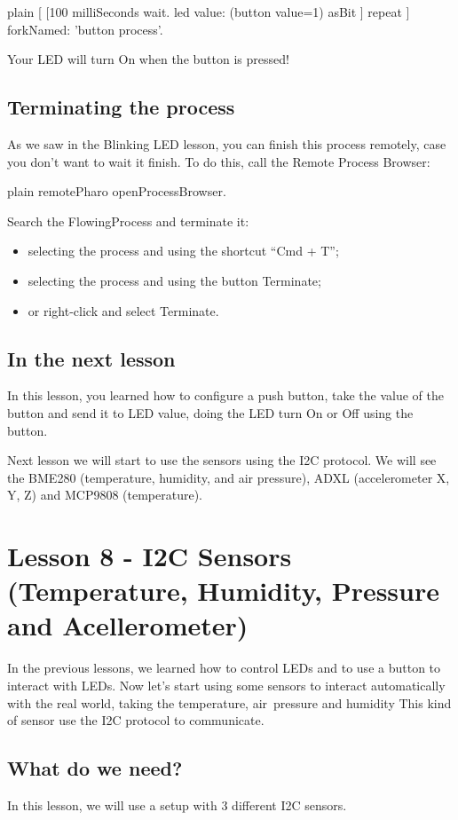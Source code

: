 \documentclass[10pt,twoside,english]{_support/latex/sbabook/sbabook}
\begin{document}
\begin{displaycode}{plain}
[ [100 milliSeconds wait. 
    led value: (button value=1) asBit
        ] repeat    
     ] forkNamed: 'button process'.
\end{displaycode}

Your LED will turn On when the button is pressed!
\section{Terminating the process}
As we saw in the Blinking LED lesson, you can finish this process remotely, case you don’t want to wait it finish. To do this, call the Remote Process Browser:

\begin{displaycode}{plain}
 remotePharo openProcessBrowser.
\end{displaycode}

Search the FlowingProcess and terminate it:

\begin{itemize}
\item selecting the process and using the shortcut “Cmd + T”;
\item selecting the process and using the button Terminate;
\item or right-click and select Terminate.
\end{itemize}
\section{In the next lesson}
In this lesson, you learned how to configure a push button, take the value of the button and send it to LED value, doing the LED turn On or Off using the button.

Next lesson we will start to use the sensors using the I2C protocol. We will see the BME280 (temperature, humidity, and air pressure), ADXL (accelerometer X, Y, Z) and MCP9808 (temperature).
\chapter{Lesson 8 - I2C Sensors (Temperature, Humidity, Pressure and Acellerometer)}
In the previous lessons, we learned how to control LEDs and to use a button to interact with LEDs. Now let's start using some sensors to interact automatically with the real world, taking the temperature, air pressure and humidity This kind of sensor use the I2C protocol to communicate.
\section{What do we need?}
In this lesson, we will use a setup with 3 different I2C sensors.
\end{document}
